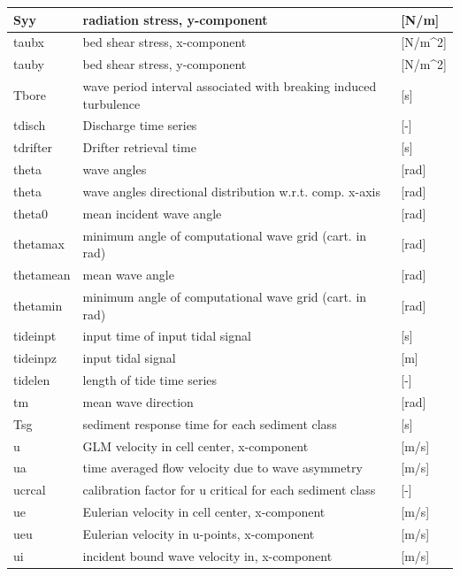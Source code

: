 \documentclass{article}
\begin{document}
\begin{tabular}{|p{0.7in}|p{2.5in}|p{0.9in}|}
Syy & radiation stress, y-component              & [N/m] \\ \hline 
taubx & bed shear stress, x-component             & [N/m\^{}2] \\ \hline 
tauby & bed shear stress, y-component             & [N/m\^{}2] \\ \hline 
Tbore & wave period interval associated with breaking induced turbulence         & [s] \\ \hline 
tdisch & Discharge time series              & [-] \\ \hline 
tdrifter & Drifter retrieval time              & [s] \\ \hline 
theta & wave angles               & [rad] \\ \hline 
theta & wave angles directional distribution w.r.t. comp. x-axis          & [rad] \\ \hline 
theta0 & mean incident wave angle             & [rad] \\ \hline 
thetamax & minimum angle of computational wave grid (cart. in rad)        & [rad] \\ \hline 
thetamean & mean wave angle              & [rad] \\ \hline 
thetamin & minimum angle of computational wave grid (cart. in rad)        & [rad] \\ \hline 
tideinpt & input time of input tidal signal          & [s] \\ \hline 
tideinpz & input tidal signal              & [m] \\ \hline 
tidelen & length of tide time series            & [-] \\ \hline 
tm & mean wave direction              & [rad] \\ \hline 
Tsg & sediment response time for each sediment class          & [s] \\ \hline 
u & GLM velocity in cell center, x-component           & [m/s] \\ \hline 
ua & time averaged flow velocity due to wave asymmetry         & [m/s] \\ \hline 
ucrcal & calibration factor for u critical for each sediment class        & [-] \\ \hline 
ue & Eulerian velocity in cell center, x-component           & [m/s] \\ \hline 
ueu & Eulerian velocity in u-points, x-component            & [m/s] \\ \hline 
ui & incident bound wave velocity in, x-component           & [m/s] \\ \hline 

\end{tabular}
\end{document}
